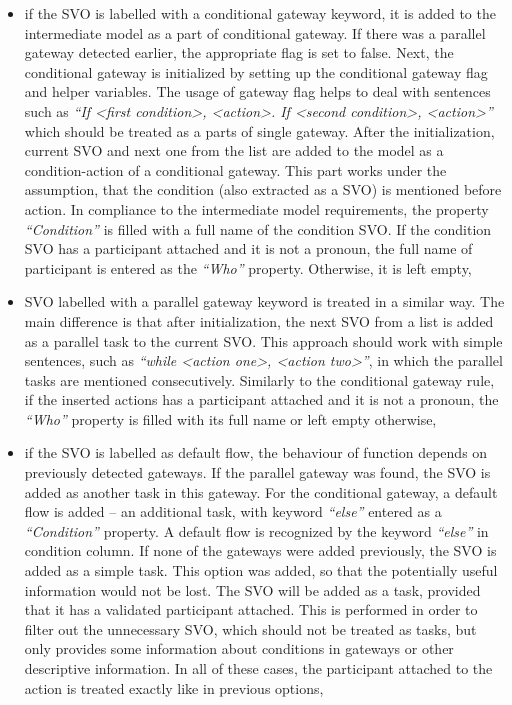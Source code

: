 \begin{itemize}
	\item if the SVO is labelled with a conditional gateway keyword, it is added to the intermediate model as a part of conditional gateway. If there was a parallel gateway detected earlier, the appropriate flag is set to false. Next, the conditional gateway is initialized by setting up the conditional gateway flag and helper variables. The usage of gateway flag helps to deal with sentences such as \emph{``If <first condition>, <action>. If <second condition>, <action>''} which should be treated as a parts of single gateway. After the initialization, current SVO and next one from the list are added to the model as a condition-action of a conditional gateway. This part works under the assumption, that the condition (also extracted as a SVO) is mentioned before action. In compliance to the intermediate model requirements, the property \emph{``Condition''} is filled with a full name of the condition SVO. If the condition SVO has a participant attached and it is not a pronoun, the full name of participant is entered as the \emph{``Who''} property. Otherwise, it is left empty,
	\item SVO labelled with a parallel gateway keyword is treated in a similar way. The main difference is that after initialization, the next SVO from a list is added as a parallel task to the current SVO. This approach should work with simple sentences, such as \emph{``while <action one>, <action two>''}, in which the parallel tasks are mentioned consecutively. Similarly to the conditional gateway rule, if the inserted actions has a participant attached and it is not a pronoun, the \emph{``Who''} property is filled with its full name or left empty otherwise,
	\item if the SVO is labelled as default flow, the behaviour of function depends on previously detected gateways. If the parallel gateway was found, the SVO is added as another task in this gateway. For the conditional gateway, a default flow is added -- an additional task, with keyword \emph{``else''} entered as a \emph{``Condition''} property. A default flow is recognized by the keyword \emph{``else''} in condition column. If none of the gateways were added previously, the SVO is added as a simple task. This option was added, so that the potentially useful information would not be lost. The SVO will be added as a task, provided that it has a validated participant attached. This is performed in order to filter out the unnecessary SVO, which should not be treated as tasks, but only provides some information about conditions in gateways or other descriptive information. In all of these cases, the participant attached to the action is treated exactly like in previous options,

\end{itemize}
